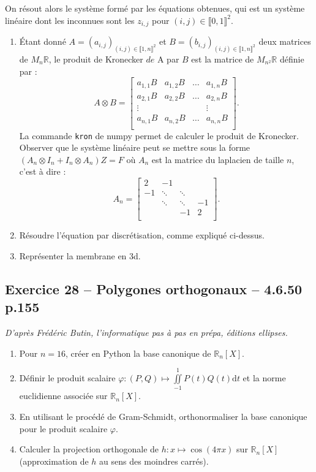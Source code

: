 \documentclass[10pt,fleqn]{article} %
\begin{document}
\begin{multicols}{2}
 On résout alors le système formé par les équations obtenues, qui est un système linéaire dont les inconnues sont les $z_{i,j}$ pour $(i,j)\in 
  \llbracket 0,1 \rrbracket^2$.
\begin{enumerate}
\item Étant donné $A=\left(a_{i,j}\right)_{(i,j)\in\llbracket 1,n \rrbracket^2 }$ et $B=\left(b_{i,j}\right)_{(i,j)\in\llbracket 1,n \rrbracket^2 }$ deux matrices de $M_n\mathbb{R}$, le produit de Kronecker $de$ A par $B$ est la matrice de $M_{n^2}\mathbb{R}$ définie par :
$$
A\otimes B = 
\begin{bmatrix}
a_{1,1}B & a_{1,2}B & \ldots & a_{1,n}B \\
a_{2,1}B & a_{2,2}B & \ldots & a_{2,n}B \\
\vdots  & & & \vdots  \\
a_{n,1}B & a_{n,2}B & \ldots & a_{n,n}B \\
\end{bmatrix} .
$$
La commande \texttt{kron} de numpy permet de calculer le produit de Kronecker. Observer que le système linéaire peut se mettre sous la forme $\left(A_n\otimes I_n+ I_n\otimes A_n\right)Z=F$ où $A_n$ est la matrice du laplacien de taille $n$, c'est à dire : 
$$
A_n = 
\begin{bmatrix}
2  & -1 & & \\
-1 & \ddots & \ddots & \\
   & \ddots &\ddots & -1\\
   &  & -1& 2\\
\end{bmatrix} .
$$
\item Résoudre l'équation par discrétisation, comme expliqué ci-dessus.
\item Représenter la membrane en 3d.
\end{enumerate}  


\subsection*{Exercice 28 -- Polygones orthogonaux -- 4.6.50 p.155}
\begin{flushright}
\textit{D'après Frédéric Butin, l'informatique pas à pas en prépa, éditions ellipses.}
\end{flushright}
\begin{enumerate}
\item Pour $n=16$, créer en Python la base canonique de $\mathbb{R}_n[X]$. 
\item Définir le produit scalaire $\varphi : \left( P,Q\right) \mapsto \iint\limits_{-1}^{1} P(t) Q(t) \text{d}t$ et la norme euclidienne associée sur $\mathbb{R}_n[X]$. 
\item En utilisant le procédé de Gram-Schmidt, orthonormaliser la  base canonique pour le produit scalaire $\varphi$.
\item Calculer la projection orthogonale de $h:x\mapsto \cos \left( 4\pi x\right)$ sur $\mathbb{R}_n[X]$ (approximation de $h$ au sens des moindres carrés).
\end{enumerate}



\end{multicols}
\end{document}
